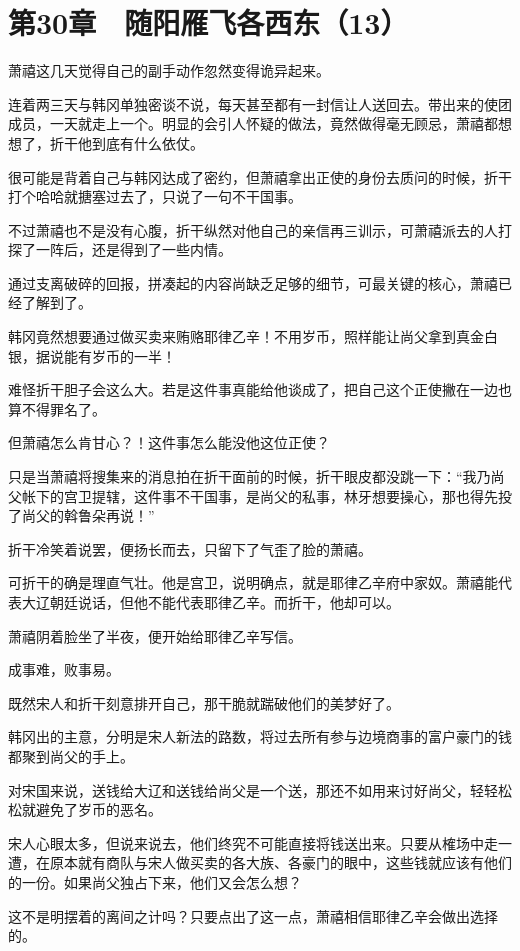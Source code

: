 \section{第30章　随阳雁飞各西东（13）}

萧禧这几天觉得自己的副手动作忽然变得诡异起来。

连着两三天与韩冈单独密谈不说，每天甚至都有一封信让人送回去。带出来的使团成员，一天就走上一个。明显的会引人怀疑的做法，竟然做得毫无顾忌，萧禧都想想了，折干他到底有什么依仗。

很可能是背着自己与韩冈达成了密约，但萧禧拿出正使的身份去质问的时候，折干打个哈哈就搪塞过去了，只说了一句不干国事。

不过萧禧也不是没有心腹，折干纵然对他自己的亲信再三训示，可萧禧派去的人打探了一阵后，还是得到了一些内情。

通过支离破碎的回报，拼凑起的内容尚缺乏足够的细节，可最关键的核心，萧禧已经了解到了。

韩冈竟然想要通过做买卖来贿赂耶律乙辛！不用岁币，照样能让尚父拿到真金白银，据说能有岁币的一半！

难怪折干胆子会这么大。若是这件事真能给他谈成了，把自己这个正使撇在一边也算不得罪名了。

但萧禧怎么肯甘心？！这件事怎么能没他这位正使？

只是当萧禧将搜集来的消息拍在折干面前的时候，折干眼皮都没跳一下：“我乃尚父帐下的宫卫提辖，这件事不干国事，是尚父的私事，林牙想要操心，那也得先投了尚父的斡鲁朵再说！”

折干冷笑着说罢，便扬长而去，只留下了气歪了脸的萧禧。

可折干的确是理直气壮。他是宫卫，说明确点，就是耶律乙辛府中家奴。萧禧能代表大辽朝廷说话，但他不能代表耶律乙辛。而折干，他却可以。

萧禧阴着脸坐了半夜，便开始给耶律乙辛写信。

成事难，败事易。

既然宋人和折干刻意排开自己，那干脆就踹破他们的美梦好了。

韩冈出的主意，分明是宋人新法的路数，将过去所有参与边境商事的富户豪门的钱都聚到尚父的手上。

对宋国来说，送钱给大辽和送钱给尚父是一个送，那还不如用来讨好尚父，轻轻松松就避免了岁币的恶名。

宋人心眼太多，但说来说去，他们终究不可能直接将钱送出来。只要从榷场中走一遭，在原本就有商队与宋人做买卖的各大族、各豪门的眼中，这些钱就应该有他们的一份。如果尚父独占下来，他们又会怎么想？

这不是明摆着的离间之计吗？只要点出了这一点，萧禧相信耶律乙辛会做出选择的。

